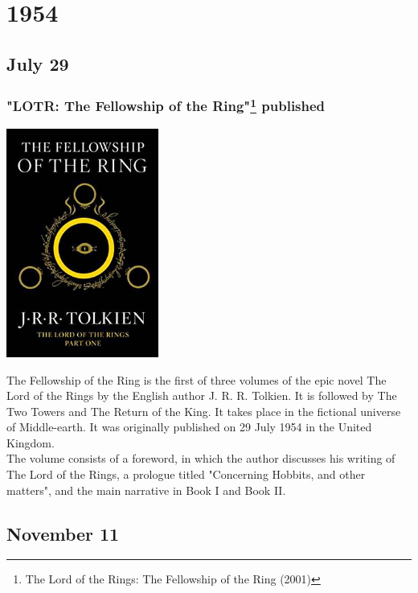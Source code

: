 \documentclass[11pt]{report}
\begin{document}
\chapter{1954}
\section{July 29}
\subsection{"LOTR: The Fellowship of the Ring"\protect\footnote{The Lord of the Rings: The Fellowship of the Ring (2001)} published}
\vspace{2mm}\begin{center}\includegraphics[width=5cm]{./img/lotrbook1.jpg}\end{center}
The Fellowship of the Ring is the first of three volumes of the epic novel The Lord of the Rings by the English author J. R. R. Tolkien. It is followed by The Two Towers and The Return of the King. It takes place in the fictional universe of Middle-earth. It was originally published on 29 July 1954 in the United Kingdom.\\
\indent The volume consists of a foreword, in which the author discusses his writing of The Lord of the Rings, a prologue titled "Concerning Hobbits, and other matters", and the main narrative in Book I and Book II.
\section{November 11}
\end{document}
